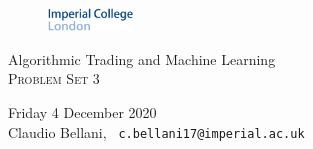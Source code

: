 \documentclass[10pt,a4paper]{article}
\date{Friday 4 December 2020}
\begin{document}
	
	\begin{center}
		\begin{figure}
			\includegraphics[width=0.2\textwidth]{imperial_logo_light}
		\end{figure}
	\begin{Large}
		Algorithmic Trading and Machine Learning \\
		\textsc{Problem Set 3}
	\end{Large}
	\end{center}

\vspace{0.2cm}

\noindent Friday 4 December 2020 \\
\noindent Claudio Bellani, \small{\texttt{ c.bellani17@imperial.ac.uk}}

\vspace{0.5cm}
\end{document}
